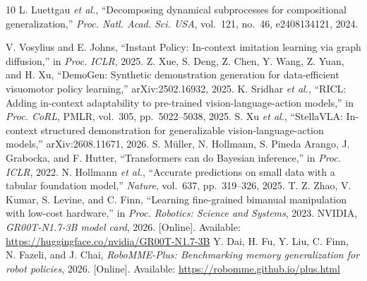\documentclass[letterpaper,10pt,conference]{ieeeconf}
\begin{document}
\begin{thebibliography}{10}
 L. Luettgau \emph{et al.}, ``Decomposing dynamical subprocesses for compositional generalization,'' \emph{Proc. Natl. Acad. Sci. USA}, vol.~121, no.~46, e2408134121, 2024.

 V. Vosylius and E. Johns, ``Instant Policy: In-context imitation learning via graph diffusion,'' in \emph{Proc. ICLR}, 2025.
 Z. Xue, S. Deng, Z. Chen, Y. Wang, Z. Yuan, and H. Xu, ``DemoGen: Synthetic demonstration generation for data-efficient visuomotor policy learning,'' arXiv:2502.16932, 2025.
 K. Sridhar \emph{et al.}, ``RICL: Adding in-context adaptability to pre-trained vision-language-action models,'' in \emph{Proc. CoRL}, PMLR, vol.~305, pp.~5022--5038, 2025.
 S. Xu \emph{et al.}, ``StellaVLA: In-context structured demonstration for generalizable vision-language-action models,'' arXiv:2608.11671, 2026.
 S. M\"uller, N. Hollmann, S. Pineda Arango, J. Grabocka, and F. Hutter, ``Transformers can do Bayesian inference,'' in \emph{Proc. ICLR}, 2022.
 N. Hollmann \emph{et al.}, ``Accurate predictions on small data with a tabular foundation model,'' \emph{Nature}, vol.~637, pp.~319--326, 2025.
 T. Z. Zhao, V. Kumar, S. Levine, and C. Finn, ``Learning fine-grained bimanual manipulation with low-cost hardware,'' in \emph{Proc. Robotics: Science and Systems}, 2023.
 NVIDIA, \emph{GR00T-N1.7-3B model card}, 2026. [Online]. Available: \url{https://huggingface.co/nvidia/GR00T-N1.7-3B}
 Y. Dai, H. Fu, Y. Liu, C. Finn, N. Fazeli, and J. Chai, \emph{RoboMME-Plus: Benchmarking memory generalization for robot policies}, 2026. [Online]. Available: \url{https://robomme.github.io/plus.html}
\end{thebibliography}
\end{document}
